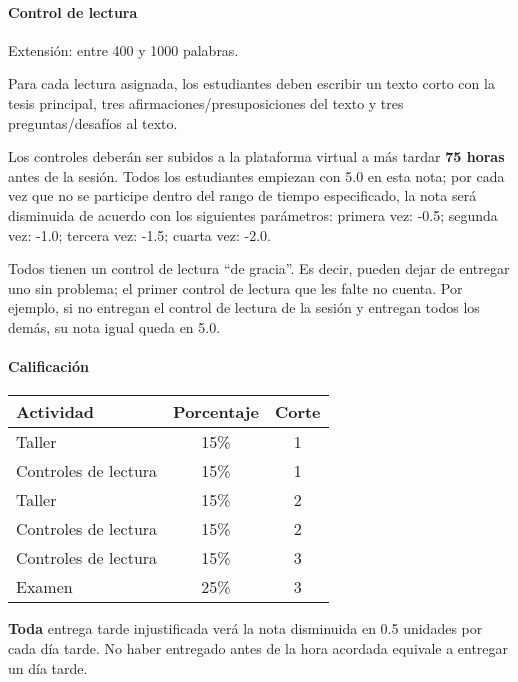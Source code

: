 \documentclass[spanish,]{article}
\let\oldparagraph\paragraph
\renewcommand{\paragraph}[1]{\oldparagraph{#1}\mbox{}}
\begin{document}
\paragraph{\texorpdfstring{\textbf{Control de
lectura}}{Control de lectura}}\label{control-de-lectura}

Extensión: entre 400 y 1000 palabras.

Para cada lectura asignada, los estudiantes deben escribir un texto
corto con la tesis principal, tres afirmaciones/presuposiciones del
texto y tres preguntas/desafíos al texto.

Los controles deberán ser subidos a la plataforma virtual a más tardar
\textbf{75 horas} antes de la sesión. Todos los estudiantes empiezan con
5.0 en esta nota; por cada vez que no se participe dentro del rango de
tiempo especificado, la nota será disminuida de acuerdo con los
siguientes parámetros: primera vez: -0.5; segunda vez: -1.0; tercera
vez: -1.5; cuarta vez: -2.0.

Todos tienen un control de lectura ``de gracia''. Es decir, pueden dejar
de entregar uno sin problema; el primer control de lectura que les falte
no cuenta. Por ejemplo, si no entregan el control de lectura de la
sesión  y entregan todos los
demás, su nota igual queda en 5.0.

\paragraph{\texorpdfstring{\textbf{Calificación}}{Calificación}}\label{calificacion}

\begin{table}[h]
\begin{tabular}{|l|c|c|}
	\hline
\textbf{Actividad}            & \textbf{Porcentaje} & \textbf{Corte} \\
\hline
Taller               & 15\%       & 1     \\
Controles de lectura & 15\%       & 1     \\
Taller               & 15\%       & 2     \\
Controles de lectura & 15\%       & 2     \\
Controles de lectura & 15\%       & 3     \\
Examen               & 25\%       & 3   \\
\hline 
\end{tabular}
\end{table}

\textbf{Toda} entrega tarde injustificada verá la nota disminuida en 0.5
unidades por cada día tarde. No haber entregado antes de la hora
acordada equivale a entregar un día tarde.
\end{document}
